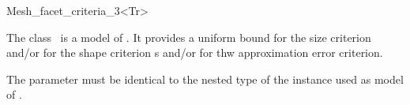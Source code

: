 \ccRefPageBegin


\begin{ccRefFunctionObjectClass}{Mesh_facet_criteria_3<Tr>}  %


\ccDefinition
  
The class \ccRefName\ is a model of . It provides
a uniform  bound for the size criterion and/or 
for the shape criterion s  and/or
for thw  approximation error criterion.




\ccParameters
The parameter  must be identical to the nested type
 of the instance used as model of
.

\ccIsModel
{}



\end{ccRefFunctionObjectClass}
